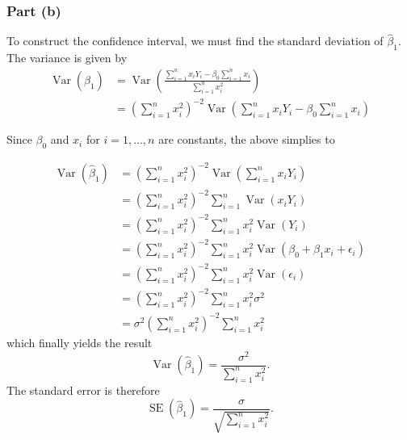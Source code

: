 \documentclass[
]{article}
\begin{document}
\hypertarget{part-b-2}{%
\subsubsection{Part (b)}\label{part-b-2}}


To construct the confidence interval, we must find the standard
deviation of \(\hat\beta_1\). The variance is given by \begin{align*}
   \operatorname{Var}(\hat\beta_1) &= \operatorname{Var}\left(\frac{\sum_{i=1}^n x_i Y_i - \beta_0 \sum_{i=1}^n x_i}{\sum_{i=1}^n x_i^2}\right)\\
   &= \left(
         \sum_{i=1}^n x_i^2
      \right)^{-2}
      \operatorname{Var}\left(
         \sum_{i=1}^n x_i Y_i - \beta_0 \sum_{i=1}^n x_i
      \right)
\end{align*}

Since \(\beta_0\) and \(x_i\) for \(i=1,\ldots,n\) are constants, the
above simplies to

\begin{align*}
   \operatorname{Var}(\hat\beta_1)
      &= \left(\sum_{i=1}^n x_i^2\right)^{-2}
         \operatorname{Var}\left(\sum_{i=1}^n x_i Y_i\right)\\
      &= \left(\sum_{i=1}^n x_i^2\right)^{-2}
         \sum_{i=1}^n \operatorname{Var}(x_i Y_i)\\
      &= \left(\sum_{i=1}^n x_i^2\right)^{-2}
         \sum_{i=1}^n x_i^2 \operatorname{Var}(Y_i)\\
      &= \left(\sum_{i=1}^n x_i^2\right)^{-2}
         \sum_{i=1}^n x_i^2 \operatorname{Var}(\beta_0 + \beta_1 x_i + \epsilon_i)\\
      &= \left(\sum_{i=1}^n x_i^2\right)^{-2}
         \sum_{i=1}^n x_i^2 \operatorname{Var}(\epsilon_i)\\
      &= \left(\sum_{i=1}^n x_i^2\right)^{-2}
         \sum_{i=1}^n x_i^2 \sigma^2\\
      &= \sigma^2 \left(\sum_{i=1}^n x_i^2\right)^{-2}
         \sum_{i=1}^n x_i^2
\end{align*} which finally yields the result \[
   \operatorname{Var}(\hat\beta_1) = \frac{\sigma^2}{\sum_{i=1}^n x_i^2}.
\] The standard error is therefore \[
   \operatorname{SE}(\hat\beta_1) = \frac{\sigma}{\sqrt{\sum_{i=1}^n x_i^2}}.
\]
\end{document}
